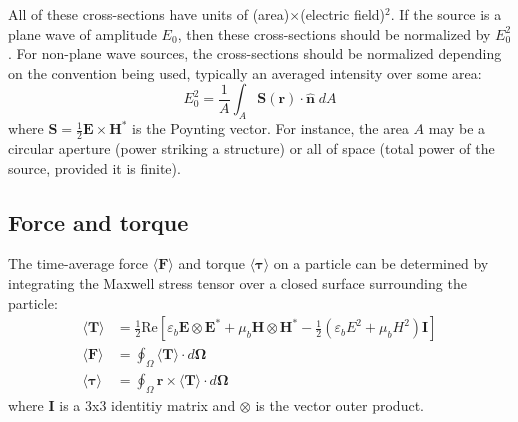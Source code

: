 \documentclass[11pt]{article}
\begin{document}
All of these cross-sections have units of (area)$\times$(electric field)$^2$.
If the source is a plane wave of amplitude $E_0$, then these cross-sections should be normalized by $E_0^2$.
For non-plane wave sources, the cross-sections should be normalized depending on the convention being used, typically an averaged intensity over some area:
\begin{equation}
    E_0^2 = \frac{1}{A} \int_A \boldsymbol{S}(\boldsymbol{r}) 
    \cdot \bm{\hat n} \;dA
\end{equation}
where $\bm{S} = \frac{1}{2} \bm{E} \times \bm{H^*}$ is the Poynting vector.
For instance, the area $A$ may be a circular aperture (power striking a structure) or all of space (total power of the source, provided it is finite).

\subsection{Force and torque}
The time-average force $\langle \bm{F} \rangle$ and torque $\langle \bm{\tau} \rangle$ on a particle can be determined by integrating the Maxwell stress tensor over a closed surface surrounding the particle: \cite{mst}
\begin{subequations}
\begin{align}
    \langle \boldsymbol{T} \rangle &= \frac{1}{2} \text{Re} \left[ \varepsilon_b  \boldsymbol{E} \otimes \boldsymbol{E^*} + \mu_b \boldsymbol{H} \otimes \boldsymbol{H^*}
    - \frac{1}{2}(\varepsilon_b E^2 + \mu_b H^2)\boldsymbol{I} \right] \\
    \langle \boldsymbol{F} \rangle &= \oint_\Omega \langle \boldsymbol{T} \rangle \cdot d \boldsymbol{\Omega} \\
    \langle \boldsymbol{\tau} \rangle &= \oint_\Omega \boldsymbol{r} \times \langle \boldsymbol{T}  \rangle \cdot d \boldsymbol{\Omega}
\end{align}
\end{subequations}
where $\bm{I}$ is a 3x3 identitiy matrix and $\otimes$ is the vector outer product.
\end{document}
